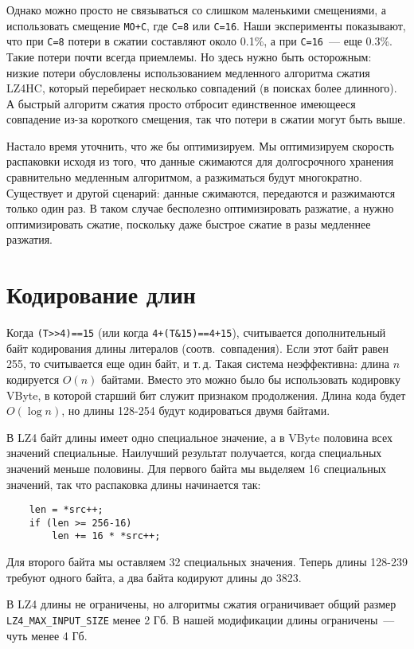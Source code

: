 \documentclass[russian,a4paper,12pt]{article}
\begin{document}
Однако можно просто не связываться со слишком маленькими смещениями, а использовать
смещение \verb|MO+C|, где \verb|C=8| или \verb|C=16|.  Наши эксперименты показывают,
что при \verb|C=8| потери в сжатии составляют около 0.1\%, а при \verb|C=16|~--- еще 0.3\%.
Такие потери почти всегда приемлемы.  Но здесь нужно быть осторожным: низкие
потери обусловлены использованием медленного алгоритма сжатия LZ4HC, который перебирает
несколько совпадений (в поисках более длинного).  А быстрый алгоритм сжатия просто отбросит
единственное имеющееся совпадение из-за короткого смещения, так что потери в сжатии могут быть выше.

Настало время уточнить, что же бы оптимизируем.  Мы оптимизируем скорость
распаковки исходя из того, что данные сжимаются для долгосрочного хранения сравнительно медленным алгоритмом,
а разжиматься будут многократно.  Существует и другой сценарий: данные сжимаются, передаются
и разжимаются только один раз.  В таком случае бесполезно оптимизировать разжатие, а нужно оптимизировать
сжатие, поскольку даже быстрое сжатие в разы медленнее разжатия.

\section{Кодирование длин}
Когда \verb|(T>>4)==15| (или когда \verb|4+(T&15)==4+15|), считывается дополнительный байт кодирования длины
литералов (соотв.~совпадения).  Если этот байт равен 255, то считывается еще один байт, и т.\,д.
Такая система неэффективна: длина $n$ кодируется $O(n)$ байтами.  Вместо это можно было бы использовать
кодировку VByte, в которой старший бит служит признаком продолжения.  Длина кода будет
$O(\log{}n)$, но длины 128-254 будут кодироваться двумя байтами.

В LZ4 байт длины имеет одно специальное значение, а в VByte половина всех значений специальные.
Наилучший результат получается, когда специальных значений меньше половины.
Для первого байта мы выделяем 16 специальных значений, так что распаковка длины начинается так:
\begin{verbatim}
    len = *src++;
    if (len >= 256-16)
        len += 16 * *src++;
\end{verbatim}
Для второго байта мы оставляем 32 специальных значения.  Теперь длины 128-239 требуют одного байта,
а два байта кодируют длины до 3823.

В LZ4 длины не ограничены, но алгоритмы сжатия ограничивает общий размер \verb|LZ4_MAX_INPUT_SIZE| менее 2 Гб.
В нашей модификации длины ограничены~--- чуть менее 4 Гб.
\end{document}

